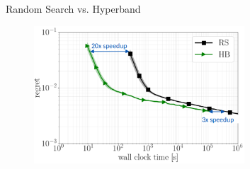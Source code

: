 \begin{frame}{Random Search vs. Hyperband}
\begin{figure}
    \centering
    \includegraphics[width=0.7\textwidth]{images/hyperband/bohb_2.png}
\end{figure}

    
\end{frame}

